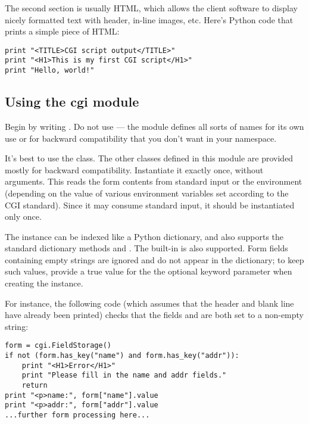 The second section is usually HTML, which allows the client software
to display nicely formatted text with header, in-line images, etc.
Here's Python code that prints a simple piece of HTML:

\begin{verbatim}
print "<TITLE>CGI script output</TITLE>"
print "<H1>This is my first CGI script</H1>"
print "Hello, world!"
\end{verbatim}

\subsection{Using the cgi module}

Begin by writing .  Do not use  --- the module defines all sorts of names for its own use or for
backward compatibility that you don't want in your namespace.

It's best to use the  class.  The other classes
defined in this module are provided mostly for backward compatibility.
Instantiate it exactly once, without arguments.  This reads the form
contents from standard input or the environment (depending on the
value of various environment variables set according to the CGI
standard).  Since it may consume standard input, it should be
instantiated only once.

The  instance can be indexed like a Python
dictionary, and also supports the standard dictionary methods
 and .  The built-in 
is also supported.  Form fields containing empty strings are ignored
and do not appear in the dictionary; to keep such values, provide
a true value for the the optional  keyword
parameter when creating the  instance.

For instance, the following code (which assumes that the 
 header and blank line have already been
printed) checks that the fields  and  are both
set to a non-empty string:

\begin{verbatim}
form = cgi.FieldStorage()
if not (form.has_key("name") and form.has_key("addr")):
    print "<H1>Error</H1>"
    print "Please fill in the name and addr fields."
    return
print "<p>name:", form["name"].value
print "<p>addr:", form["addr"].value
...further form processing here...
\end{verbatim}


